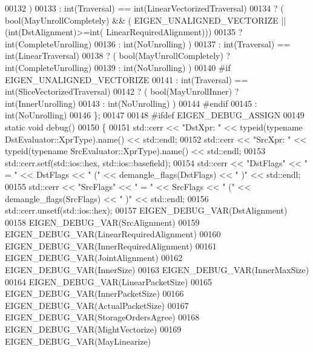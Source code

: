 \begin{DoxyCode}
00132                   )
00133               : \textcolor{keywordtype}{int}(Traversal) == int(LinearVectorizedTraversal)
00134                 ? ( bool(MayUnrollCompletely) && ( EIGEN\_UNALIGNED\_VECTORIZE || (int(DstAlignment)>=int(
      LinearRequiredAlignment)))
00135                           ? int(CompleteUnrolling)
00136                           : int(NoUnrolling) )
00137               : \textcolor{keywordtype}{int}(Traversal) == int(LinearTraversal)
00138                 ? ( bool(MayUnrollCompletely) ? int(CompleteUnrolling) 
00139                                               : int(NoUnrolling) )
00140 #\textcolor{keywordflow}{if} EIGEN\_UNALIGNED\_VECTORIZE
00141               : \textcolor{keywordtype}{int}(Traversal) == int(SliceVectorizedTraversal)
00142                 ? ( bool(MayUnrollInner) ? int(InnerUnrolling)
00143                                          : int(NoUnrolling) )
00144 #endif
00145               : \textcolor{keywordtype}{int}(NoUnrolling)
00146   \};
00147 
00148 \textcolor{preprocessor}{#ifdef EIGEN\_DEBUG\_ASSIGN}
00149   \textcolor{keyword}{static} \textcolor{keywordtype}{void} debug()
00150   \{
00151     std::cerr << \textcolor{stringliteral}{"DstXpr: "} << \textcolor{keyword}{typeid}(\textcolor{keyword}{typename} DstEvaluator::XprType).name() << std::endl;
00152     std::cerr << \textcolor{stringliteral}{"SrcXpr: "} << \textcolor{keyword}{typeid}(\textcolor{keyword}{typename} SrcEvaluator::XprType).name() << std::endl;
00153     std::cerr.setf(std::ios::hex, std::ios::basefield);
00154     std::cerr << \textcolor{stringliteral}{"DstFlags"} << \textcolor{stringliteral}{" = "} << DstFlags << \textcolor{stringliteral}{" ("} << demangle\_flags(DstFlags) << \textcolor{stringliteral}{" )"} << std::endl;
00155     std::cerr << \textcolor{stringliteral}{"SrcFlags"} << \textcolor{stringliteral}{" = "} << SrcFlags << \textcolor{stringliteral}{" ("} << demangle\_flags(SrcFlags) << \textcolor{stringliteral}{" )"} << std::endl;
00156     std::cerr.unsetf(std::ios::hex);
00157     EIGEN\_DEBUG\_VAR(DstAlignment)
00158     EIGEN\_DEBUG\_VAR(SrcAlignment)
00159     EIGEN\_DEBUG\_VAR(LinearRequiredAlignment)
00160     EIGEN\_DEBUG\_VAR(InnerRequiredAlignment)
00161     EIGEN\_DEBUG\_VAR(JointAlignment)
00162     EIGEN\_DEBUG\_VAR(InnerSize)
00163     EIGEN\_DEBUG\_VAR(InnerMaxSize)
00164     EIGEN\_DEBUG\_VAR(LinearPacketSize)
00165     EIGEN\_DEBUG\_VAR(InnerPacketSize)
00166     EIGEN\_DEBUG\_VAR(ActualPacketSize)
00167     EIGEN\_DEBUG\_VAR(StorageOrdersAgree)
00168     EIGEN\_DEBUG\_VAR(MightVectorize)
00169     EIGEN\_DEBUG\_VAR(MayLinearize)

\end{DoxyCode}
